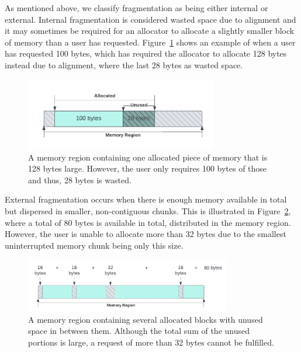 
As mentioned above, we classify fragmentation as being either internal or external. Internal fragmentation is considered wasted space due to alignment and it may sometimes be required for an allocator to allocate a slightly smaller block of memory than a user has requested. Figure~\ref{fig:internal_fragmentation} shows an example of when a user has requested 100 bytes, which has required the allocator to allocate 128 bytes instead due to alignment, where the last 28 bytes as wasted space.


\begin{figure}[H]
    \centering
    \includegraphics[width=0.75\textwidth]{figures/internal_fragmentation.png}
    \caption{A memory region containing one allocated piece of memory that is 128 bytes large. However, the user only requires 100 bytes of those and thus, 28 bytes is wasted.}
    \label{fig:internal_fragmentation}
\end{figure}

External fragmentation occurs when there is enough memory available in total but dispersed in smaller, non-contiguous chunks. This is illustrated in Figure~\ref{fig:external_fragmentation}, where a total of 80 bytes is available in total, distributed in the memory region. However, the user is unable to allocate more than 32 bytes due to the smallest uninterrupted memory chunk being only this size.

\begin{figure}[H]
    \centering
    \includegraphics[width=0.8\textwidth]{figures/external_fragmentation.png}
    \caption{A memory region containing several allocated blocks with unused space in between them. Although the total sum of the unused portions is large, a request of more than 32 bytes cannot be fulfilled.}
    \label{fig:external_fragmentation}
\end{figure}



